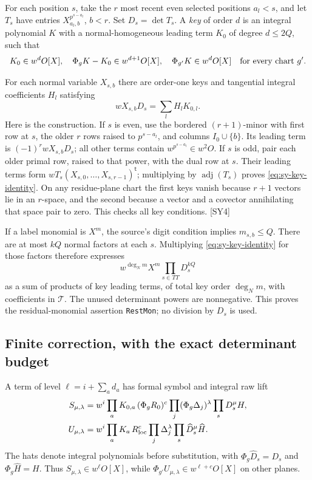\documentclass[11pt,a4paper]{article}
\numberwithin{equation}{section}
\theoremstyle{remark}\newtheorem{remark}[theorem]{Remark}
\begin{document}
For each position $s$, take the $r$ most recent even selected positions $a_l<s$, and let $T_s$ have entries $X_{a_l,b}^{p^{s-a_l}}$, $b<r$. Set $D_s=\det T_s$. A \emph{key} of order $d$ is an integral polynomial $K$ with a normal-homogeneous leading term $K_0$ of degree $d\le2Q$, such that
\[
K_0\in w^dO[X],\quad \Phi_gK-K_0\in w^{d+1}O[X],\quad
\Phi_{g'}K\in w^dO[X]\quad\hbox{for every chart }g'.
\]

For each normal variable $X_{s,b}$ there are order-one keys and tangential integral coefficients $H_l$ satisfying
\begin{equation}\label{eq:sy-key-identity}
wX_{s,b}D_s=\sum_lH_lK_{0,l}.
\end{equation}
Here is the construction. If $s$ is even, use the bordered $(r+1)$-minor with first row at $s$, the older $r$ rows raised to $p^{s-a_l}$, and columns $I_0\cup\{b\}$. Its leading term is $(-1)^rwX_{s,b}D_s$; all other terms contain $w^{p^{s-a_l}}\in w^2O$. If $s$ is odd, pair each older primal row, raised to that power, with the dual row at $s$. Their leading terms form $wT_s(X_{s,0},\ldots,X_{s,r-1})^{\mathsf t}$; multiplying by $\operatorname{adj}(T_s)$ proves \eqref{eq:sy-key-identity}. On any residue-plane chart the first keys vanish because $r+1$ vectors lie in an $r$-space, and the second because a vector and a covector annihilating that space pair to zero. This checks all key conditions. \textsf{[SY4]}

If a label monomial is $X^m$, the source's digit condition implies $m_{s,b}\le Q$. There are at most $kQ$ normal factors at each $s$. Multiplying \eqref{eq:sy-key-identity} for those factors therefore expresses
\[
w^{\deg_N m}X^m\prod_{s\in TT}D_s^{kQ}
\]
as a sum of products of key leading terms, of total key order $\deg_Nm$, with coefficients in $\mathcal T$. The unused determinant powers are nonnegative. This proves the residual-monomial assertion \texttt{RestMon}; no division by $D_s$ is used.

\subsection{Finite correction, with the exact determinant budget}

A term of level $\ell=i+\sum_a d_a$ has formal symbol and integral raw lift
\begin{align*}
S_{\mu,\lambda}&=w^i\prod_aK_{0,a}\,(\Phi_gR_0)^c
            \prod_j(\Phi_g\Delta_j)^\lambda\prod_sD_s^\mu H,\\
U_{\mu,\lambda}&=w^i\prod_aK_a\,R_{\rm loc}^c
            \prod_j\Delta_j^\lambda\prod_s\widehat D_s^\mu\widehat H.
\end{align*}
The hats denote integral polynomials before substitution, with $\Phi_g\widehat D_s=D_s$ and $\Phi_g\widehat H=H$. Thus $S_{\mu,\lambda}\in w^\ell O[X]$, while $\Phi_{g'}U_{\mu,\lambda}\in w^{\ell+c}O[X]$ on other planes.
\end{document}
